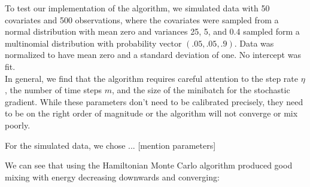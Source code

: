 To test our implementation of the algorithm, we simulated data with 50 covariates and 500 observations, where the covariates were sampled from a normal distribution with mean zero and variances 25, 5, and 0.4 sampled form a multinomial distribution with probability vector $(.05, .05, .9)$. Data was normalized to have mean zero and a standard deviation of one. No intercept was fit.\\

In general, we find that the algorithm requires careful attention to the step rate $\eta$, the number of time steps $m$, and the size of the minibatch for the stochastic gradient. While these parameters don't need to be calibrated precisely, they need to be on the right order of magnitude or the algorithm will not converge or mix poorly.

For the simulated data, we chose ... [mention parameters]

We can see that using the Hamiltonian Monte Carlo algorithm produced good mixing with energy decreasing downwards and converging:

